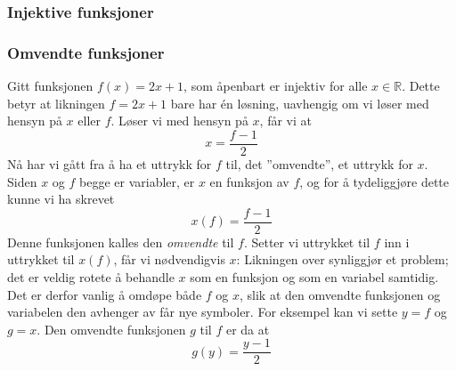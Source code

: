 \subsubsection{Injektive funksjoner}
\subsubsection{Omvendte funksjoner}
Gitt funksjonen $ f(x)=2x+1 $, som åpenbart er injektiv for alle $ x\in \mathbb{R} $. Dette betyr at likningen $ f=2x+1 $ bare har én løsning, uavhengig om vi løser med hensyn på $ x $ eller $ f $. Løser vi med hensyn på $ x $, får vi at
\[ x=\frac{f-1}{2} \]
Nå har vi gått fra å ha et uttrykk for $ f $ til, det ''omvendte'', et uttrykk for $ x $. Siden $ x $ og $ f $ begge er variabler, er $ x $ en funksjon av $ f $, og for å tydeliggjøre dette kunne vi ha skrevet
\[ x(f)=\frac{f-1}{2} \]
Denne funksjonen kalles den \textit{omvendte} til $ f $. Setter vi uttrykket til $ f $ inn i uttrykket til $ x(f) $, får vi nødvendigvis $ x $:
Likningen over synliggjør et problem; det er veldig rotete å behandle $ x $ som en funksjon og som en variabel samtidig. Det er derfor vanlig å omdøpe både $ f $ og $ x $, slik at den omvendte funksjonen og variabelen den avhenger av får nye symboler. For eksempel kan vi sette $ y=f$ og $ g=x $. Den omvendte funksjonen $ g $ til $ f $ er da at
\[ g(y)=\frac{y-1}{2} \]
\newpage
{}
